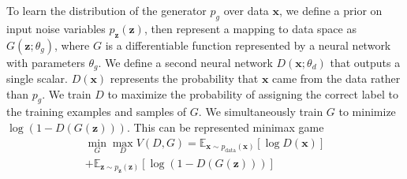 \documentclass{vldb}
\begin{document}
To learn the distribution of the generator $p_g$ over data $\bm{x}$, we define a prior on input noise variables $p_{\bm{z}}(\bm{z})$, then represent a mapping to data space as $G(\bm{z}; \theta_g)$, where $G$ is a differentiable function represented by a neural network with parameters $\theta_g$. We define a second neural network $D(\bm{x}; \theta_d)$ that outputs a single scalar. $D(\bm{x})$ represents the probability that $\bm{x}$ came from the data rather than $p_g$. We train $D$ to maximize the probability of assigning the correct label to the training examples and samples of $G$. We simultaneously train $G$ to minimize $\log(1-D(G(\bm{z})))$.
This can be represented minimax game \\

\begin{multline} \label{eu_eqn}
\min_{G} \max_{D} V(D, G)=\mathbb{E}_{\bm{x} \sim p_{\text{data}}(\bm{x})}[\log D(\bm{x})]\\
+\mathbb{E}_{\bm{z} \sim p_{\bm{z}}(\bm{z})}[\log (1 - D(G(\bm{z})))]
\end{multline}
\end{document}
